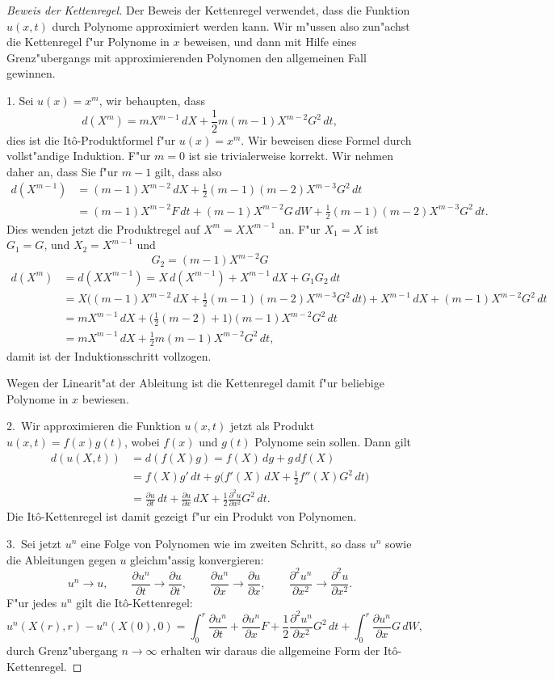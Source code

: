 \begin{proof}[Beweis der Kettenregel]
Der Beweis der Kettenregel verwendet, dass die Funktion $u(x,t)$ durch
Polynome approximiert werden kann.
Wir m"ussen also zun"achst die Kettenregel f"ur Polynome in $x$ beweisen,
und dann mit Hilfe eines Grenz"ubergangs mit approximierenden Polynomen
den allgemeinen Fall gewinnen.

1. Sei $u(x)=x^m$, wir behaupten, dass
\[
d(X^m)=mX^{m-1}\,dX + \frac12m(m-1)X^{m-2}G^2\,dt,
\]
dies ist die It\^o-Produktformel f"ur $u(x)=x^m$.
Wir beweisen diese Formel durch vollst"andige Induktion.
F"ur $m=0$ ist sie trivialerweise korrekt.
Wir nehmen daher an, dass Sie f"ur $m-1$ gilt, dass also
\begin{align*}
d(X^{m-1})
&=
(m-1)X^{m-2}\,dX + \frac12(m-1)(m-2)X^{m-3}G^2\,dt
\\
&=
(m-1)X^{m-2}F\,dt + (m-1)X^{m-2}G\,dW + \frac12(m-1)(m-2)X^{m-3}G^2\,dt.
\end{align*}
Dies wenden jetzt die Produktregel auf $X^m = XX^{m-1}$ an.
F"ur $X_1=X$ ist $G_1=G$, und $X_2=X^{m-1}$ und
\[
G_2
=
(m-1)X^{m-2}G
\]
\begin{align*}
d(X^m)
&=
d(XX^{m-1})
=
X\,d(X^{m-1}) + X^{m-1}\,dX +G_1G_2\,dt
\\
&=
X\biggl( (m-1)X^{m-2}\,dX + \frac12(m-1)(m-2)X^{m-3}G^2\,dt\biggr)
+
X^{m-1}\,dX
+
(m-1)X^{m-2}G^2\,dt
\\
&=
mX^{m-1}\,dX
+\biggl(\frac12(m-2)+1\biggr)(m-1)X^{m-2}G^2\,dt
\\
&=
mX^{m-1}\,dX +\frac12m(m-1)X^{m-2}G^2\,dt,
\end{align*}
damit ist der Induktionsschritt vollzogen.

Wegen der Linearit"at der Ableitung ist die Kettenregel damit
f"ur beliebige Polynome in $x$ bewiesen.

2.~Wir approximieren die Funktion $u(x,t)$ jetzt als Produkt
$u(x,t)=f(x)g(t)$, wobei $f(x)$ und $g(t)$ Polynome sein sollen.
Dann gilt
\begin{align*}
d(u(X,t))
&=
d(f(X)g)
=
f(X)\,dg + g\,df(X)
\\
&=
f(X)g'\,dt + g\biggl(f'(X)\,dX + \frac12 f''(X)G^2\,dt\biggr)
\\
&=
\frac{\partial u}{\partial t}\,dt
+
\frac{\partial u}{\partial x}\,dX
+
\frac12\frac{\partial^2u}{\partial x^2}G^2\,dt.
\end{align*}
Die It\^o-Kettenregel ist damit gezeigt f"ur ein Produkt von Polynomen.

3.~Sei jetzt $u^n$ eine Folge von Polynomen wie im zweiten Schritt,
so dass $u^n$ sowie die Ableitungen gegen $u$ gleichm"assig konvergieren:
\[
u^n\to u,
\qquad
\frac{\partial u^n}{\partial t} \to \frac{\partial u}{\partial t},
\qquad
\frac{\partial u^n}{\partial x} \to \frac{\partial u}{\partial x},
\qquad
\frac{\partial^2 u^n}{\partial x^2} \to \frac{\partial^2 u}{\partial x^2}.
\]
F"ur jedes $u^n$ gilt die It\^o-Kettenregel:
\[
u^n(X(r),r)-u^n(X(0),0)
=
\int_0^r
\frac{\partial u^n}{\partial t}
+
\frac{\partial u^n}{\partial x}F
+
\frac12 \frac{\partial^2 u^n}{\partial x^2}G^2\,dt
+
\int_0^r\frac{\partial u^n}{\partial x}G\,dW,
\]
durch Grenz"ubergang $n\to \infty$ erhalten wir daraus die allgemeine
Form der It\^o-Kettenregel.
\end{proof}

